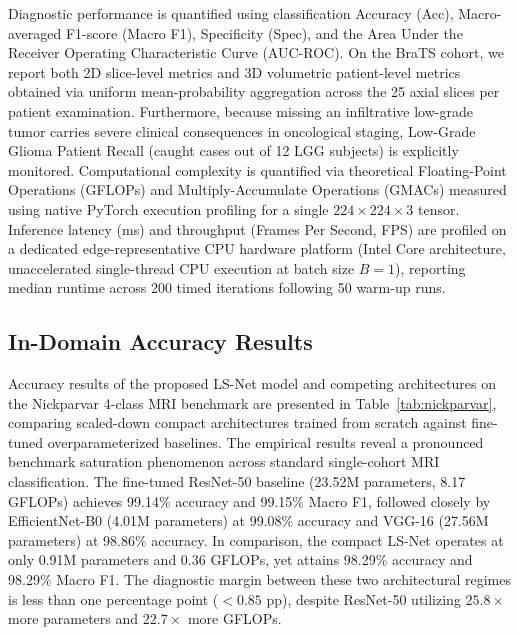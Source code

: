 Diagnostic performance is quantified using classification Accuracy (Acc), Macro-averaged F1-score (Macro F1), Specificity (Spec), and the Area Under the Receiver Operating Characteristic Curve (AUC-ROC). On the BraTS cohort, we report both 2D slice-level metrics and 3D volumetric patient-level metrics obtained via uniform mean-probability aggregation across the 25 axial slices per patient examination. Furthermore, because missing an infiltrative low-grade tumor carries severe clinical consequences in oncological staging, Low-Grade Glioma Patient Recall (caught cases out of 12 LGG subjects) is explicitly monitored. Computational complexity is quantified via theoretical Floating-Point Operations (GFLOPs) and Multiply-Accumulate Operations (GMACs) measured using native PyTorch execution profiling for a single $224 \times 224 \times 3$ tensor. Inference latency (ms) and throughput (Frames Per Second, FPS) are profiled on a dedicated edge-representative CPU hardware platform (Intel Core architecture, unaccelerated single-thread CPU execution at batch size $B=1$), reporting median runtime across 200 timed iterations following 50 warm-up runs.

\subsection{In-Domain Accuracy Results}

Accuracy results of the proposed LS-Net model and competing architectures on the Nickparvar 4-class MRI benchmark are presented in Table~\ref{tab:nickparvar}, comparing scaled-down compact architectures trained from scratch against fine-tuned overparameterized baselines. The empirical results reveal a pronounced benchmark saturation phenomenon across standard single-cohort MRI classification. The fine-tuned ResNet-50 baseline (23.52M parameters, 8.17 GFLOPs) achieves 99.14\% accuracy and 99.15\% Macro F1, followed closely by EfficientNet-B0 (4.01M parameters) at 99.08\% accuracy and VGG-16 (27.56M parameters) at 98.86\% accuracy. In comparison, the compact LS-Net operates at only 0.91M parameters and 0.36 GFLOPs, yet attains 98.29\% accuracy and 98.29\% Macro F1. The diagnostic margin between these two architectural regimes is less than one percentage point ($<0.85$ pp), despite ResNet-50 utilizing $25.8\times$ more parameters and $22.7\times$ more GFLOPs.

